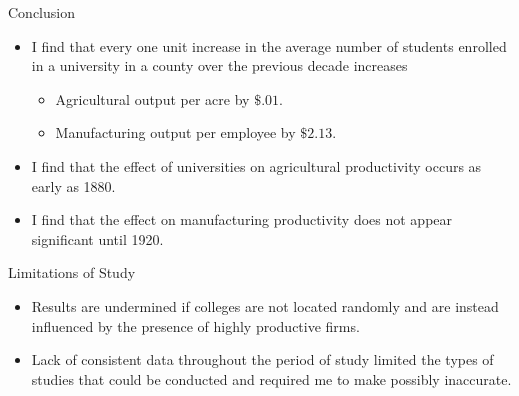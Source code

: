 \documentclass{beamer}
\begin{document}
\begin{frame}{Conclusion}
\begin{itemize}
\item I find that every one unit increase in the average number of students enrolled in a university in a county over the previous decade increases 
\begin{itemize}
\item Agricultural output per acre by $\$.01$. 
\item Manufacturing output per employee by $\$2.13$.
\end{itemize}
\item I find that the effect of universities on agricultural productivity occurs as early as 1880.
\item I find that the effect on manufacturing productivity does not appear significant until 1920.
\end{itemize}
\end{frame}

\begin{frame}{Limitations of Study}
\begin{itemize}
\item Results are undermined if colleges are not located randomly and are instead influenced by the presence of highly productive firms.
\item Lack of consistent data throughout the period of study limited the types of studies that could be conducted and required me to make possibly inaccurate.
\end{itemize}
\end{frame}
\end{document}
